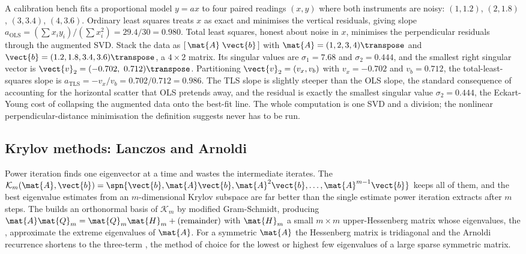 \begin{example}
A calibration bench fits a proportional model $y = a x$ to four paired
readings $(x, y)$ where both instruments are noisy: $(1, 1.2)$,
$(2, 1.8)$, $(3, 3.4)$, $(4, 3.6)$. Ordinary least squares treats $x$
as exact and minimises the vertical residuals, giving slope $a_{\text{OLS}}
= (\sum x_i y_i)/(\sum x_i^2) = 29.4/30 = 0.980$. Total least squares, honest about
noise in $x$, minimises the perpendicular residuals through the
augmented SVD. Stack the data as $[\,\mat{A}\;\vect{b}\,]$ with $\mat{A}
= (1, 2, 3, 4)\transpose$ and $\vect{b} = (1.2, 1.8, 3.4, 3.6)
\transpose$, a $4 \times 2$ matrix. Its singular values are $\sigma_1 =
7.68$ and $\sigma_2 = 0.444$, and the smallest right singular vector is
$\vect{v}_2 = (-0.702,\ 0.712)\transpose$. Partitioning $\vect{v}_2 =
(v_x, v_b)$ with $v_x = -0.702$ and $v_b = 0.712$, the total-least-squares
slope is $a_{\text{TLS}} = -v_x/v_b = 0.702/0.712 = 0.986$. The TLS
slope is slightly steeper than the OLS slope, the standard consequence
of accounting for the horizontal scatter that OLS pretends away, and
the residual is exactly the smallest singular value $\sigma_2 = 0.444$,
the Eckart-Young cost of collapsing the augmented data onto the
best-fit line. The whole computation is one SVD and a division; the
nonlinear perpendicular-distance minimisation the definition suggests
never has to be run.
\end{example}

\subsection{Krylov methods: Lanczos and Arnoldi}

Power iteration finds one eigenvector at a time and wastes the
intermediate iterates. The  $\mathcal{K}_{m}
(\mat{A}, \vect{b}) = \spn\{\vect{b}, \mat{A}\vect{b}, \mat{A}^{2}
\vect{b}, \ldots, \mat{A}^{m-1}\vect{b}\}$ keeps all of them, and the
best eigenvalue estimates from an $m$-dimensional Krylov subspace are
far better than the single estimate power iteration extracts after $m$
steps. The  builds an orthonormal basis of
$\mathcal{K}_{m}$ by modified Gram-Schmidt, producing
$\mat{A}\mat{Q}_{m} = \mat{Q}_{m}\mat{H}_{m} + \text{(remainder)}$ with
$\mat{H}_{m}$ a small $m \times m$ upper-Hessenberg matrix whose
eigenvalues, the , approximate the extreme
eigenvalues of $\mat{A}$. For a symmetric $\mat{A}$ the Hessenberg
matrix is tridiagonal and the Arnoldi recurrence shortens to the
three-term , the method of choice for the
lowest or highest few eigenvalues of a large sparse symmetric matrix.

